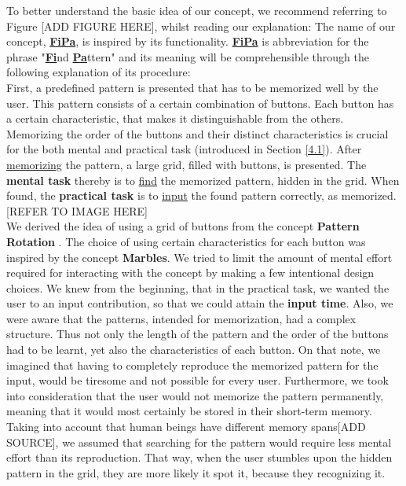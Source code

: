 To better understand the basic idea of our concept, we recommend referring to Figure [ADD FIGURE HERE], whilst reading our explanation: 
The name of our concept, \underline{\textbf{FiPa}}, is inspired by its functionality. \underline{\textbf{FiPa}} is abbreviation for the phrase "\underline{\textbf{Fi}}nd \underline{\textbf{Pa}}ttern" and its meaning will be comprehensible through the following explanation of its procedure: \\
First, a predefined pattern is presented that has to be memorized well by the user. This pattern consists of a certain combination of buttons. Each button has a certain characteristic, that makes it distinguishable from the others. Memorizing the order of the buttons and their distinct characteristics is crucial for the both mental and practical task (introduced in Section \ref{4.1}). After \underline{memorizing} the pattern, a large grid, filled with buttons, is presented. The \textbf{mental task} thereby is to \underline{find} the memorized pattern, hidden in the grid. When found, the \textbf{practical task} is to \underline{input} the found pattern correctly, as memorized. [REFER TO IMAGE HERE]\\

We derived the idea of using a grid of buttons from the concept \textbf{Pattern Rotation} \cite{patternRotation, anonymous}. The choice of using certain characteristics for each button was inspired by the concept \textbf{Marbles}\cite{patternRotation, anonymous}. We tried to limit the amount of mental effort required for interacting with the concept by making a few intentional design choices. We knew from the beginning, that in the practical task, we wanted the user to an input contribution, so that we could attain the \textbf{input time}. Also, we were aware that the patterns, intended for memorization, had a complex structure. Thus not only the length of the pattern and the order of the buttons had to be learnt, yet also the characteristics of each button. On that note, we imagined that having to completely reproduce the memorized pattern for the input, would be tiresome and not possible for every user. Furthermore, we took into consideration that the user would not memorize the pattern permanently, meaning that it would most certainly be stored in their short-term memory. Taking into account that human beings have different memory spans[ADD SOURCE], we assumed that searching for the pattern would require less mental effort than its reproduction. That way, when the user stumbles upon the hidden pattern in the grid, they are more likely it spot it, because they recognizing it. 


